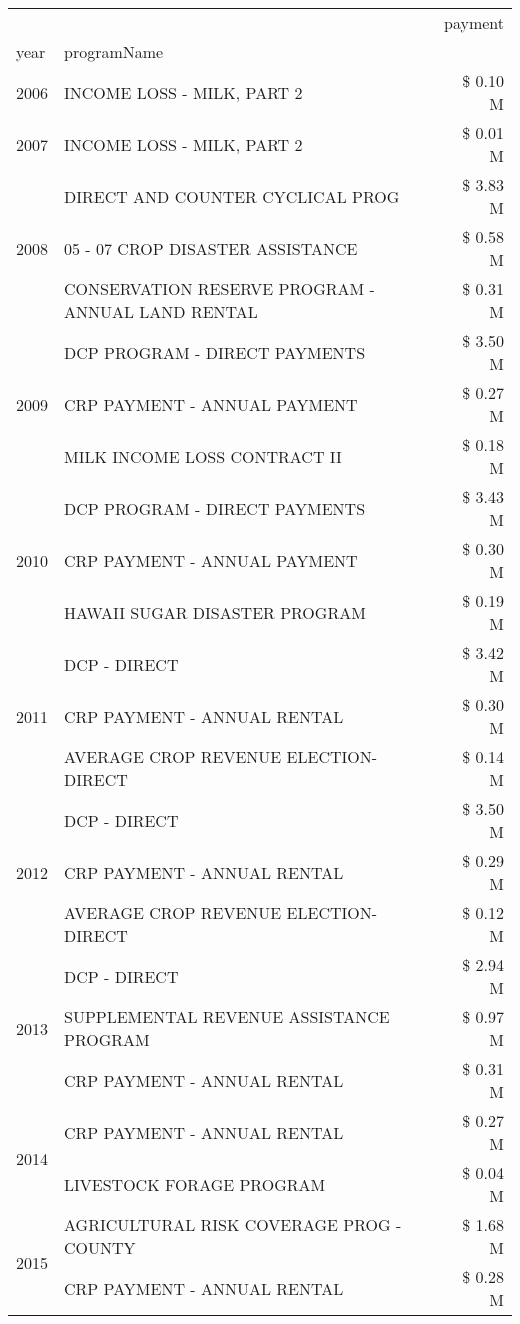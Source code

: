 \begin{tabular}{llr}
\toprule
 &  & payment \\
year & programName &  \\
\midrule
2006 & INCOME LOSS - MILK, PART 2 & \$ 0.10 M \\
\cline{1-3}
2007 & INCOME LOSS - MILK, PART 2 & \$ 0.01 M \\
\cline{1-3}
\multirow[t]{3}{*}{2008} & DIRECT AND COUNTER CYCLICAL PROG & \$ 3.83 M \\
 & 05 - 07 CROP DISASTER ASSISTANCE & \$ 0.58 M \\
 & CONSERVATION RESERVE PROGRAM - ANNUAL LAND RENTAL & \$ 0.31 M \\
\cline{1-3}
\multirow[t]{3}{*}{2009} & DCP PROGRAM - DIRECT PAYMENTS & \$ 3.50 M \\
 & CRP PAYMENT - ANNUAL PAYMENT & \$ 0.27 M \\
 & MILK INCOME LOSS CONTRACT II & \$ 0.18 M \\
\cline{1-3}
\multirow[t]{3}{*}{2010} & DCP PROGRAM - DIRECT PAYMENTS & \$ 3.43 M \\
 & CRP PAYMENT - ANNUAL PAYMENT & \$ 0.30 M \\
 & HAWAII SUGAR DISASTER PROGRAM & \$ 0.19 M \\
\cline{1-3}
\multirow[t]{3}{*}{2011} & DCP - DIRECT & \$ 3.42 M \\
 & CRP PAYMENT - ANNUAL RENTAL & \$ 0.30 M \\
 & AVERAGE CROP REVENUE ELECTION-DIRECT & \$ 0.14 M \\
\cline{1-3}
\multirow[t]{3}{*}{2012} & DCP - DIRECT & \$ 3.50 M \\
 & CRP PAYMENT - ANNUAL RENTAL & \$ 0.29 M \\
 & AVERAGE CROP REVENUE ELECTION-DIRECT & \$ 0.12 M \\
\cline{1-3}
\multirow[t]{3}{*}{2013} & DCP - DIRECT & \$ 2.94 M \\
 & SUPPLEMENTAL REVENUE ASSISTANCE PROGRAM & \$ 0.97 M \\
 & CRP PAYMENT - ANNUAL RENTAL & \$ 0.31 M \\
\cline{1-3}
\multirow[t]{2}{*}{2014} & CRP PAYMENT - ANNUAL RENTAL & \$ 0.27 M \\
 & LIVESTOCK FORAGE PROGRAM & \$ 0.04 M \\
\cline{1-3}
\multirow[t]{3}{*}{2015} & AGRICULTURAL RISK COVERAGE PROG - COUNTY & \$ 1.68 M \\
 & CRP PAYMENT - ANNUAL RENTAL & \$ 0.28 M \\

\end{tabular}
